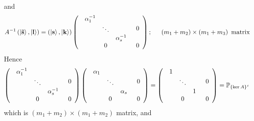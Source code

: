 and 
\begin{equation}
A^{-1}\left( \left| {\bf \tilde{s}}\right\rangle {\bf ,}\left| {\bf l}%
\right\rangle \right) =\left( \left| {\bf s}\right\rangle {\bf ,}\left| {\bf %
k}\right\rangle \right) \left( 
\begin{array}{cc}
\begin{array}{ccc}
\alpha _{1}^{-1} &  &  \\ 
& \ddots &  \\ 
&  & \alpha _{s}^{-1}%
\end{array}
& 0 \\ 
0 & 0%
\end{array}%
\right) ;\quad \text{ }\left( m_{1}+m_{2}\right) \times \left(
m_{1}+m_{3}\right) \text{ matrix}
\end{equation}%
Hence 
\begin{equation}
\left( 
\begin{array}{cc}
\begin{array}{ccc}
\alpha _{1}^{-1} &  &  \\ 
& \ddots &  \\ 
&  & \alpha _{s}^{-1}%
\end{array}
& 0 \\ 
0 & 0%
\end{array}%
\right) \left( 
\begin{array}{cc}
\begin{array}{ccc}
\alpha _{1} &  &  \\ 
& \ddots &  \\ 
&  & \alpha _{s}%
\end{array}
& 0 \\ 
0 & 0%
\end{array}%
\right) =\left( 
\begin{array}{cc}
\begin{array}{ccc}
1 &  &  \\ 
& \ddots &  \\ 
&  & 1%
\end{array}
& 0 \\ 
0 & 0%
\end{array}%
\right) ={\Bbb P}_{\left\{ \ker A\right\} ^{c}}
\end{equation}%
which is $\left( m_{1}+m_{2}\right) \times \left( m_{1}+m_{2}\right) $
matrix, and 
